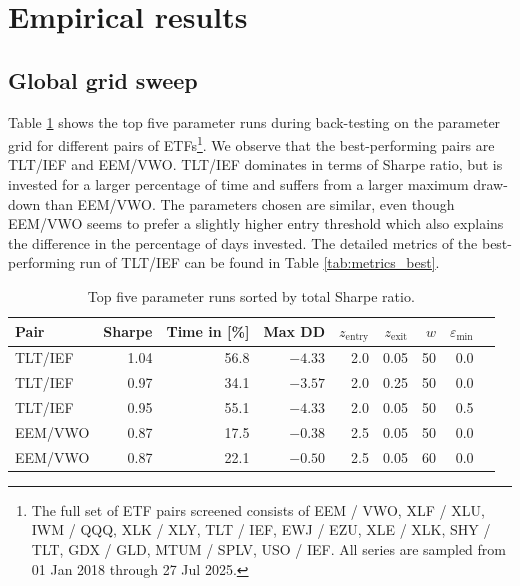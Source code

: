 \documentclass{article}
\begin{document}
\section{Empirical results}\label{sec:empirical_results}

\subsection{Global grid sweep}
Table \ref{tab:top5_results} shows the top five parameter runs during back-testing on the parameter grid for different pairs of ETFs\footnote{The full set of ETF pairs screened consists of EEM / VWO, XLF / XLU, IWM / QQQ, XLK / XLY, TLT / IEF, EWJ / EZU, XLE / XLK, SHY / TLT, GDX / GLD, MTUM / SPLV, USO / IEF. All series are sampled from 01 Jan 2018 through 27 Jul 2025.}.
We observe that the best-performing pairs are TLT/IEF and EEM/VWO. TLT/IEF dominates in terms of Sharpe ratio, but is invested for a larger percentage of time and suffers from a larger maximum draw-down than EEM/VWO. The parameters chosen are similar, even though EEM/VWO seems to prefer a slightly higher entry threshold which also explains the difference in the percentage of days invested.
The detailed metrics of the best-performing run of TLT/IEF can be found in Table \ref{tab:metrics_best}.

\begin{table}[htbp]
\centering
\caption{Top five parameter runs sorted by total Sharpe ratio.}
\label{tab:top5_results}
\begin{tabular}{lrrrrrrrr}
\toprule
{Pair} &
{Sharpe} &
{Time in [\%]} &
{Max DD} &
$z_{\mathrm{entry}}$ &
$z_{\mathrm{exit}}$ &
$w$ &
$\varepsilon_{\min}$ \\
\midrule
TLT/IEF & 1.04 & 56.8 & $-4.33$ & 2.0 & 0.05 & 50 & 0.0 \\
TLT/IEF & 0.97 & 34.1 & $-3.57$ & 2.0 & 0.25 & 50 & 0.0 \\
TLT/IEF & 0.95 & 55.1 & $-4.33$ & 2.0 & 0.05 & 50 & 0.5 \\
EEM/VWO & 0.87 & 17.5 & $-0.38$ & 2.5 & 0.05 & 50 & 0.0 \\
EEM/VWO & 0.87 & 22.1 & $-0.50$ & 2.5 & 0.05 & 60 & 0.0 \\
\bottomrule
\end{tabular}
\end{table}
\end{document}

